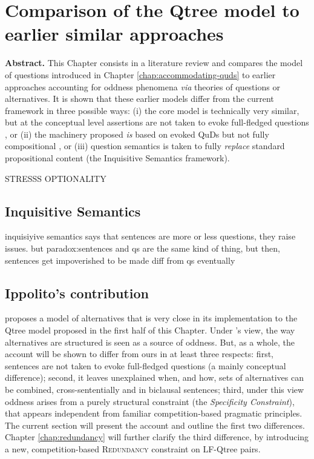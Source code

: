 \chapter{Comparison of the Qtree model to earlier similar approaches}\label{chap:lit-review}

\textbf{Abstract.} 
This Chapter consists in a literature review and compares the model of questions introduced in Chapter \ref{chap:accommodating-quds} to earlier approaches accounting for oddness phenomena \textit{via} theories of questions or alternatives. It is shown that these earlier models differ from the current framework in three possible ways: (i) the core model is technically very similar, but at the conceptual level assertions are not taken to evoke full-fledged questions \citep{Ippolito2019}, or (ii) the machinery proposed \textit{is} based on evoked QuDs but not fully compositional \citep{Zhang2022}, or (iii) question semantics is taken to fully \textit{replace} standard propositional content (the Inquisitive Semantics framework).



STRESSS OPTIONALITY
\section{Inquisitive Semantics}
inquisiyive semantics says that sentences are more or less questions, they raise issues.
but paradox:sentences and qs are the same kind of thing, but then, sentences get impoverished to be made diff from qs eventually


\section{Ippolito's contribution}

\citet{Ippolito2019} proposes a model of alternatives that is very close in its implementation to the Qtree model proposed in the first half of this Chapter. Under \citeauthor{Ippolito2019}'s view, the way alternatives are structured is seen as a source of oddness. But, as a whole, the account will be shown to differ from ours in at least three respects: first, sentences are not taken to evoke full-fledged questions (a mainly conceptual difference); second, it leaves unexplained when, and how, sets of alternatives can be combined, cross-sententially and in biclausal sentences; third, under this view oddness arises from a purely structural constraint (the \textit{Specificity Constraint}), that appears independent from familiar competition-based pragmatic principles. The current section will present the account and outline the first two differences. Chapter \ref{chap:redundancy} will further clarify the third difference, by introducing a new, competition-based \textsc{Redundancy} constraint on LF-Qtree pairs.

